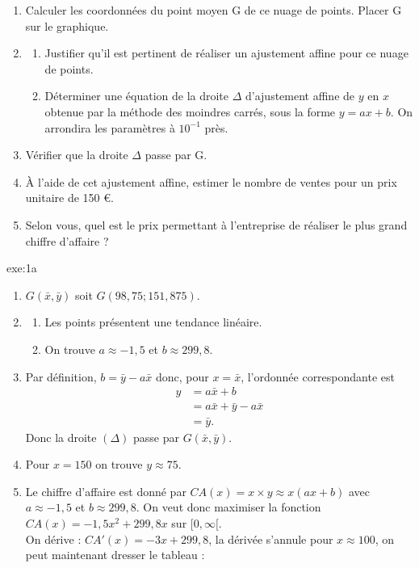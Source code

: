 {\begin{enumerate}
  \item Calculer les coordonnées du point moyen G de ce nuage de points. Placer G sur le graphique.
  \item \begin{enumerate}
	 \item Justifier qu'il est pertinent de réaliser un ajustement affine pour ce nuage de points.
	 \item Déterminer une équation de la droite $\Delta$ d'ajustement affine de $y$ en $x$ obtenue par la méthode des moindres carrés, sous la forme $y=ax+b$.
	 On arrondira les paramètres à $10^{-1}$ près.
	\end{enumerate}
	\item Vérifier que la droite $\Delta$ passe par G.
	\item À l'aide de cet ajustement affine, estimer le nombre de ventes pour un prix unitaire de 150 \euro.
	\item Selon vous, quel est le prix permettant à l'entreprise de réaliser le plus grand chiffre d'affaire ?
 \end{enumerate}
}{exe:1a}{
\begin{enumerate}
  \item $G(\bar{x}, \bar{y})$ soit $G(98,75 ; 151,875)$.
  \item \begin{enumerate}
	 \item Les points présentent une tendance linéaire.
	 \item On trouve $a \approx -1,5$ et $b \approx 299,8$.
	\end{enumerate}
	\item Par définition, $b = \bar{y} - a \bar{x}$ donc, pour $x = \bar{x}$, l'ordonnée correspondante est 
	\begin{align*}
	y & = a \bar{x} + b \\
	& = a \bar{x} + \bar{y} - a \bar{x} \\
	& = \bar{y} .
	\end{align*}
	Donc la droite $(\Delta)$ passe par $G(\bar{x}, \bar{y})$.
	\item Pour $x = 150$ on trouve $y \approx 75$.
	\item Le chiffre d'affaire est donné par $CA(x) = x \times y \approx x(ax+b)$ avec $a \approx -1,5$ et $b \approx 299,8$.
	On veut donc maximiser la fonction $CA(x) = -1,5x^2 + 299,8 x$ sur $[0, \infty[$. \\
	On dérive : $CA'(x) = -3x + 299,8$, la dérivée s'annule pour $x \approx 100$, on peut maintenant dresser le tableau :


\end{enumerate}}
